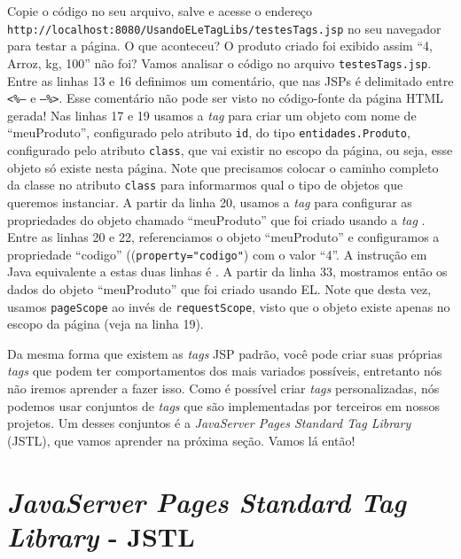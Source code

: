 
Copie o código no seu arquivo, salve e acesse o endereço \linebreak \texttt{http://localhost:8080/UsandoELeTagLibs/testesTags.jsp} no seu navegador para testar a página. O que aconteceu? O produto criado foi exibido assim ``4, Arroz, kg, 100'' não foi? Vamos analisar o código no arquivo \texttt{testesTags.jsp}. Entre as linhas 13 e 16 definimos um comentário, que nas JSPs é delimitado entre \texttt{<\%--} e \texttt{--\%>}. Esse comentário não pode ser visto no código-fonte da página HTML gerada! Nas linhas 17 e 19 usamos a \textit{tag}  para criar um objeto com nome de ``meuProduto'', configurado pelo atributo \texttt{id}, do tipo \texttt{entidades.Produto}, configurado pelo atributo \texttt{class}, que vai existir no escopo da página, ou seja, esse objeto só existe nesta página. Note que precisamos colocar o caminho completo da classe no atributo \texttt{class} para informarmos qual o tipo de objetos que queremos instanciar. A partir da linha 20, usamos a \textit{tag}  para configurar as propriedades do objeto chamado ``meuProduto'' que foi criado usando a \textit{tag} . Entre as linhas 20 e 22, referenciamos o objeto ``meuProduto'' e configuramos a propriedade ``codigo'' ((\texttt{property="codigo"}) com o valor ``4''. A instrução em Java equivalente a estas duas linhas é . A partir da linha 33, mostramos então os dados do objeto ``meuProduto'' que foi criado usando EL. Note que desta vez, usamos \texttt{pageScope} ao invés de \texttt{requestScope}, visto que o objeto existe apenas no escopo da página (veja na linha 19).

Da mesma forma que existem as \textit{tags} JSP padrão, você pode criar suas próprias \textit{tags} que podem ter comportamentos dos mais variados possíveis, entretanto nós não iremos aprender a fazer isso. Como é possível criar \textit{tags} personalizadas, nós podemos usar conjuntos de \textit{tags} que são implementadas por terceiros em nossos projetos. Um desses conjuntos é a \textit{JavaServer Pages Standard Tag Library} (JSTL), que vamos aprender na próxima seção. Vamos lá então!



\section{\textit{JavaServer Pages Standard Tag Library} - JSTL}

